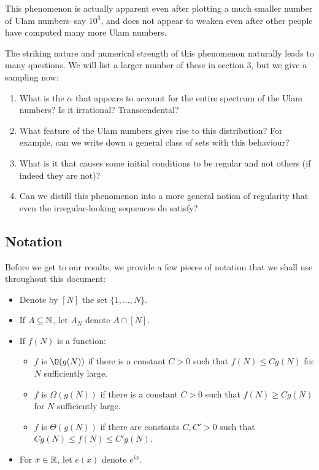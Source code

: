 \documentclass{report}
\theoremstyle{remark}
\numberwithin{equation}{section}
\begin{document}
This phenomenon is actually apparent even after plotting a much
smaller number of Ulam numbers--say $10^3$, and does not appear to
weaken even after other people have computed many more Ulam numbers.

The striking nature and numerical strength of this phenomenon
naturally leads to many questions.  We will list a larger number of
these in section 3, but we give a sampling now: 

\begin{enumerate}
\item What is the $\alpha$ that appears to account for the entire
  spectrum of the Ulam numbers?  Is it irrational?  Transcendental?

\item What feature of the Ulam numbers gives rise to this
  distribution?  For example, can we write down a general class of
  sets with this behaviour?

\item What is it that causes some initial conditions to be regular and
  not others (if indeed they are not)?

\item Can we distill this phenomenon into a more general notion of
  regularity that even the irregular-looking sequences do satisfy?
\end{enumerate}

\subsection{Notation}

Before we get to our results, we provide a few pieces of notation that
we shall use throughout this document: 

\begin{itemize}
\item Denote by $[N]$ the set $\{1, \ldots, N\}$.
\item If $A \subseteq \mathbb{N}$, let $A_N$ denote $A \cap [N]$.  
\item If $f(N)$ is a function: 
\begin{itemize}
\item $f$ is $\O(g(N))$ if there is a constant $C > 0$ such that $f(N)
  \leq C g(N)$ for $N$ sufficiently large.
\item $f$ is $\Omega(g(N))$ if there is a constant $C > 0$ such that
  $f(N) \geq C g(N)$ for $N$ sufficiently large.
\item $f$ is $\Theta(g(N))$ if there are constants $C, C' > 0$ such
  that $C g(N) \leq f(N) \leq C' g(N)$.
\end{itemize}
\item For $x \in \mathbb{R}$, let $e(x)$ denote $e^{ix}$.
\end{itemize}
\end{document}
